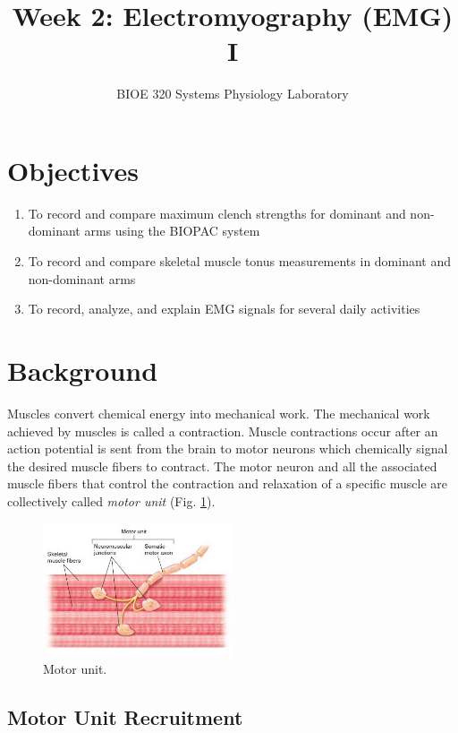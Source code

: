 \documentclass{article}
\title{Week 2: Electromyography (EMG) I}
\author{BIOE 320 Systems Physiology Laboratory}
\date{}
\begin{document}
\large
\maketitle

\section*{Objectives}
\begin{enumerate}
	\item To record and compare maximum clench strengths for dominant and non-dominant arms using the BIOPAC system
	\item To record and compare skeletal muscle tonus measurements in dominant and non-dominant arms
	\item To record, analyze, and explain EMG signals for several daily activities
\end{enumerate}

\section*{Background}
Muscles convert chemical energy into mechanical work. The mechanical work
achieved by muscles is called a contraction. Muscle contractions occur after an action potential is sent from the brain to motor neurons which chemically signal the desired muscle fibers to contract. The motor neuron and all the associated muscle fibers that control the contraction and relaxation of a specific muscle are collectively called \textit{motor unit} (Fig. \ref{motor_unit}).

\begin{figure}[h]
\includegraphics[width=0.5\textwidth]{../images/EMG_I_1.jpg}
\centering
\caption{Motor unit.}
\label{motor_unit}
\end{figure}

\subsection*{Motor Unit Recruitment}
\end{document}
